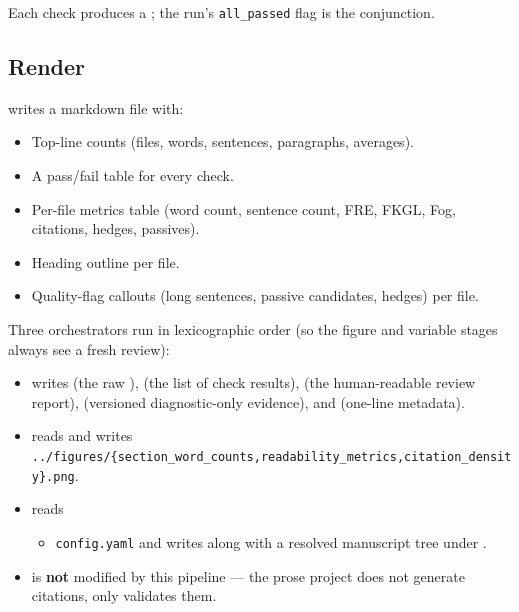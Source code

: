 \documentclass[
  english,
]{article}
\providecommand{\tightlist}{%
  \setlength{\itemsep}{0pt}\setlength{\parskip}{0pt}}
\begin{document}
Each check produces a ;
the run's \texttt{all\_passed} flag is the conjunction.

\subsection{Render}\label{render}

 writes a markdown file
with:

\begin{itemize}
\tightlist
\item
  Top-line counts (files, words, sentences, paragraphs, averages).
\item
  A pass/fail table for every check.
\item
  Per-file metrics table (word count, sentence count, FRE, FKGL, Fog,
  citations, hedges, passives).
\item
  Heading outline per file.
\item
  Quality-flag callouts (long sentences, passive candidates, hedges) per
  file.
\end{itemize}

Three orchestrators run in lexicographic order (so the figure and
variable stages always see a fresh review):

\begin{itemize}
\tightlist
\item
   writes
   (the raw
  ),  (the list of
  check results),  (the human-readable
  review report),  (versioned
  diagnostic-only evidence), and 
  (one-line metadata).
\item
   reads
   and writes
  \texttt{../figures/\{section\_word\_counts,readability\_metrics,citation\_density\}.png}.
\item
   reads

  \begin{itemize}
  \tightlist
  \item
    \texttt{config.yaml} and writes
     along with a
    resolved manuscript tree under .
  \end{itemize}
\item
   is \textbf{not} modified by this
  pipeline --- the prose project does not generate citations, only
  validates them.
\end{itemize}
\end{document}
